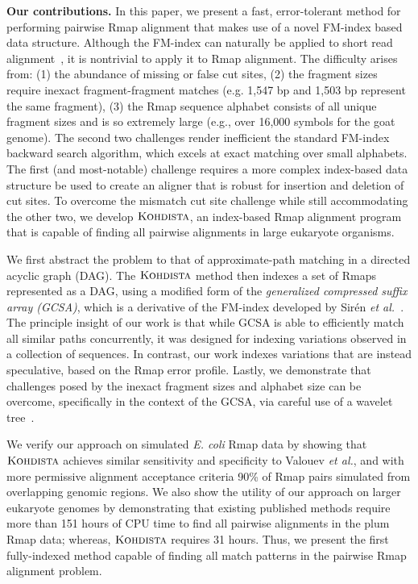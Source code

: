 {\bf Our contributions.}  In this paper, we present a fast, error-tolerant method for performing pairwise Rmap alignment that makes use of a novel FM-index based data structure.  Although the FM-index can naturally be applied to short read alignment~\cite{bwa,bowtie}, it is nontrivial to apply it to Rmap alignment.  The difficulty arises from: (1) the abundance of missing or false cut sites, (2) the fragment sizes require inexact fragment-fragment matches (e.g. 1,547 bp and 1,503 bp represent the same fragment), (3) the Rmap sequence alphabet consists of all unique fragment sizes and is so extremely large (e.g., over 16,000 symbols for the goat genome).  The second two challenges render inefficient the standard FM-index backward search algorithm, which excels at exact matching over small alphabets. The first (and most-notable) challenge requires a more complex index-based data structure be used to create an aligner that is robust for insertion and deletion of cut sites. To overcome the mismatch cut site challenge while still accommodating the other two, we develop $\mbox{\rm \textsc{Kohdista}}$, an index-based Rmap alignment program that is capable of finding all pairwise alignments in large eukaryote organisms.

We first abstract the problem to that of approximate-path matching in a directed
acyclic graph (DAG). The $\mbox{\rm \textsc{Kohdista}}$ method then indexes a set of Rmaps represented
as a DAG, using a modified form of the {\em generalized compressed suffix array (GCSA)}, which is
a derivative of the FM-index developed by Sir\'{e}n {\it et al.}~\cite{dag_method}.  The principle insight of our work is that while GCSA is able to efficiently match all similar paths concurrently, it was designed for indexing variations observed in a collection of sequences.
In contrast, our work indexes variations that are instead speculative, based on the Rmap error profile.  Lastly, we demonstrate that challenges posed by the inexact fragment sizes and alphabet size can be overcome, specifically in the context of the GCSA, via careful use of a wavelet tree~\cite{GNPtcs11,wabi2014}.

We verify our approach on simulated {\em E. coli} Rmap data by showing that $\mbox{\rm \textsc{Kohdista}}$ achieves similar sensitivity and specificity to Valouev {\it et al.}, and with more permissive alignment acceptance criteria 90\% of Rmap pairs simulated from overlapping genomic regions.
We also show the utility of our approach on larger eukaryote genomes by demonstrating that existing published methods require more than 151 hours of CPU time to find all pairwise alignments in the plum Rmap data; whereas, $\mbox{\rm \textsc{Kohdista}}$ requires 31 hours. Thus, we present the first fully-indexed method capable of finding all match patterns in the pairwise Rmap alignment problem.



